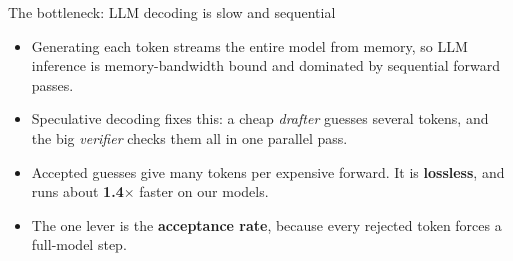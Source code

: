 \documentclass[aspectratio=169,11pt]{beamer}
\begin{document}
\begin{frame}{The bottleneck: LLM decoding is slow and sequential}
\begin{itemize}
  \item Generating each token streams the entire model from memory, so LLM inference is memory-bandwidth bound and dominated by sequential forward passes.
  \item Speculative decoding fixes this: a cheap \emph{drafter} guesses several tokens, and the big \emph{verifier} checks them all in one parallel pass.
  \item Accepted guesses give many tokens per expensive forward. It is \textbf{lossless}, and runs about \textbf{1.4$\times$} faster on our models.
  \item The one lever is the \textbf{acceptance rate}, because every rejected token forces a full-model step.
\end{itemize}
\end{frame}
\end{document}
